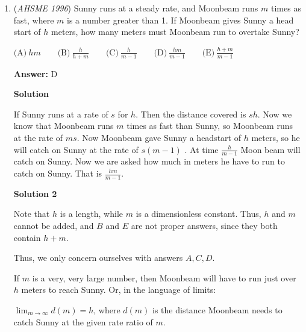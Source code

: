 \begin{enumerate}
 If \( k \) is odd, then \( f(k) \) in terms of \( k \) is \(\frac{k+3}{2}\).

 Next, we have \( f\left(\frac{k+3}{2}\right) \), and \(\frac{k+3}{2}\) is even, so \( f\left(\frac{k+3}{2}\right) = \frac{k+3}{4} \).

 We are given that \( f\left(\frac{k+3}{4}\right) = 27 \).

 
 \[\frac{k+3}{4} = 27 \implies k = 105.\]

 The sum of its digits is \( 1 + 0 + 5 = 6 \).

 


 {gnv12}

 


	\item (\textit{AHSME 1996}) Sunny runs at a steady rate, and Moonbeam runs $m$ times as fast, where $m$ is a number greater than 1.  If Moonbeam gives Sunny a head start of $h$ meters, how many meters must Moonbeam run to overtake Sunny? 


 $\text{(A)}\ hm\qquad\text{(B)}\ \frac{h}{h+m}\qquad\text{(C)}\ \frac{h}{m-1}\qquad\text{(D)}\ \frac{hm}{m-1}\qquad\text{(E)}\ \frac{h+m}{m-1}$

 \textbf{Answer: }D



\textbf{Solution}

If Sunny runs at a rate of $s$ for $h$. Then the distance covered is $sh$. Now we know that Moonbeam runs $m$ times as fast than Sunny, so Moonbeam runs at the rate of $ms$. Now Moonbeam gave Sunny a headstart of $h$ meters, so he will catch  on Sunny at the rate of $s(m-1)$ . At time $\frac{h}{m-1}$  Moon beam will catch on Sunny. Now  we are asked how much in meters he have to run to catch on Sunny. That is $\frac{hm}{m-1}$.

 



\textbf{Solution 2}

Note that $h$ is a length, while $m$ is a dimensionless constant.  Thus, $h$ and $m$ cannot be added, and $B$ and $E$ are not proper answers, since they both contain $h+m$.

 Thus, we only concern ourselves with answers $A, C, D$.

 If $m$ is a very, very large number, then Moonbeam will have to run just over $h$ meters to reach Sunny.  Or, in the language of limits:

 $\lim_{m\rightarrow \infty} d(m) = h$, where $d(m)$ is the distance Moonbeam needs to catch Sunny at the given rate ratio of $m$.


\end{enumerate}
